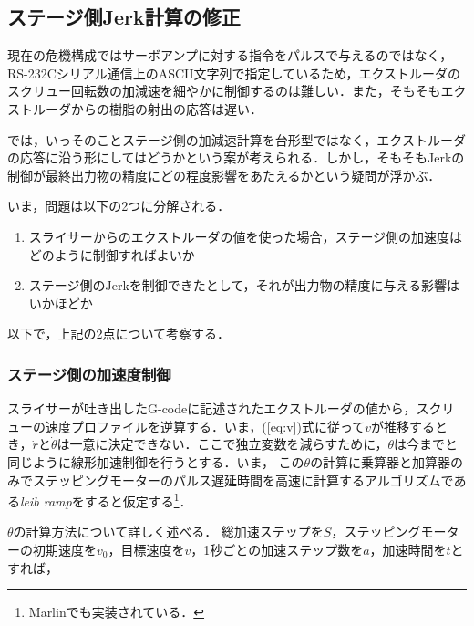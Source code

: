 \documentclass[twocolumn,oneside,a4paper]{article}
\begin{document}
\subsection{ステージ側Jerk計算の修正}
現在の危機構成ではサーボアンプに対する指令をパルスで与えるのではなく，RS-232Cシリアル通信上のASCII文字列で指定しているため，エクストルーダのスクリュー回転数の加減速を細やかに制御するのは難しい．また，そもそもエクストルーダからの樹脂の射出の応答は遅い．

では，いっそのことステージ側の加減速計算を台形型ではなく，エクストルーダの応答に沿う形にしてはどうかという案が考えられる．しかし，そもそもJerkの制御が最終出力物の精度にどの程度影響をあたえるかという疑問が浮かぶ．

いま，問題は以下の2つに分解される．

\begin{enumerate}
     \item スライサーからのエクストルーダの値を使った場合，ステージ側の加速度はどのように制御すればよいか
     \item ステージ側のJerkを制御できたとして，それが出力物の精度に与える影響はいかほどか    
\end{enumerate}

以下で，上記の2点について考察する．

\subsubsection{ステージ側の加速度制御}
スライサーが吐き出したG-codeに記述されたエクストルーダの値から，スクリューの速度プロファイルを逆算する．いま，(\ref{eq:v})式に従って$v$が推移するとき，$\dot{r}$と$\dot{\theta}$は一意に決定できない．ここで独立変数を減らすために，$\theta$は今までと同じように線形加速制御を行うとする．いま， この$\theta$の計算に乗算器と加算器のみでステッピングモーターのパルス遅延時間を高速に計算するアルゴリズムである{\it leib ramp}\cite{leib}をすると仮定する\footnote{Marlinでも実装されている．}．

$\theta$の計算方法について詳しく述べる．
総加速ステップを$S$，ステッピングモーターの初期速度を$v_0$，目標速度を$v$，1秒ごとの加速ステップ数を$a$，加速時間を$t$とすれば，
\end{document}
